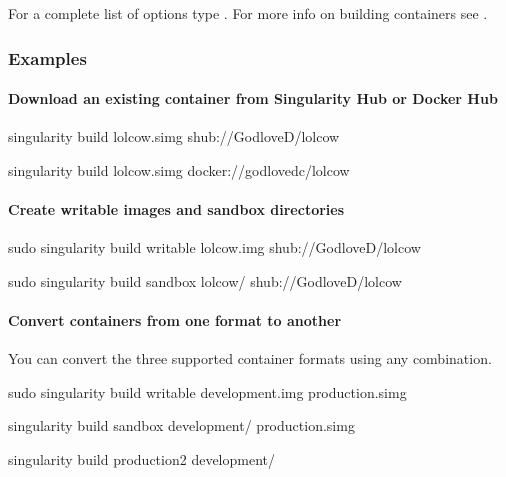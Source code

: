 \documentclass[letterpaper,10pt,english]{sphinxmanual}
\begin{document}
For a complete list of  options type . For more info on building
containers see {\hyperref[\detokenize{build_a_container:build-a-container}]{}}.


\subsubsection{Examples}
\label{\detokenize{appendix:id32}}

\paragraph{Download an existing container from Singularity Hub or Docker Hub}
\label{\detokenize{appendix:download-an-existing-container-from-singularity-hub-or-docker-hub}}
%
\begin{sphinxVerbatim}[commandchars=\\\{\}]
\PYGZdl{} singularity build lolcow.simg shub://GodloveD/lolcow

\PYGZdl{} singularity build lolcow.simg docker://godlovedc/lolcow
\end{sphinxVerbatim}


\paragraph{Create \textendash{}writable images and \textendash{}sandbox directories}
\label{\detokenize{appendix:create-writable-images-and-sandbox-directories}}
%
\begin{sphinxVerbatim}[commandchars=\\\{\}]
\PYGZdl{} sudo singularity build \PYGZhy{}\PYGZhy{}writable lolcow.img shub://GodloveD/lolcow

\PYGZdl{} sudo singularity build \PYGZhy{}\PYGZhy{}sandbox lolcow/ shub://GodloveD/lolcow
\end{sphinxVerbatim}


\paragraph{Convert containers from one format to another}
\label{\detokenize{appendix:convert-containers-from-one-format-to-another}}
You can convert the three supported container formats using any
combination.

%
\begin{sphinxVerbatim}[commandchars=\\\{\}]
\PYGZdl{} sudo singularity build \PYGZhy{}\PYGZhy{}writable development.img production.simg

\PYGZdl{} singularity build \PYGZhy{}\PYGZhy{}sandbox development/ production.simg

\PYGZdl{} singularity build production2 development/
\end{sphinxVerbatim}
\end{document}

